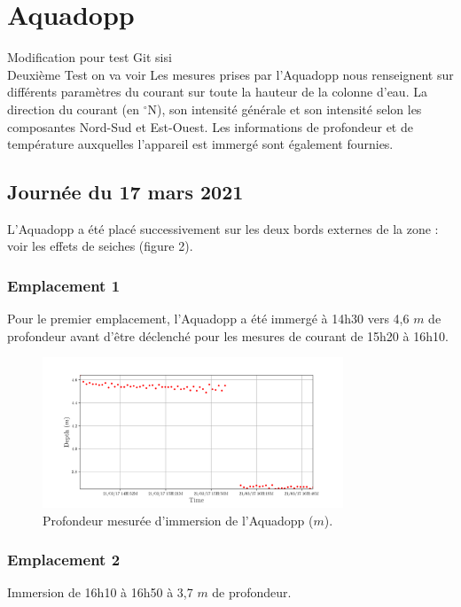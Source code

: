 \documentclass[12pt]{article}
\begin{document}
\section{Aquadopp}
Modification pour test Git sisi\\
Deuxième Test on va voir 
Les mesures prises par l'Aquadopp nous renseignent sur différents paramètres du courant sur toute la hauteur de la colonne d'eau. La direction du courant (en $^{\circ}$N), son intensité générale et son intensité selon les composantes Nord-Sud et Est-Ouest. Les informations de profondeur et de température auxquelles l'appareil est immergé sont également fournies.

\subsection{Journée du 17 mars 2021}
L'Aquadopp a été placé successivement sur les deux bords externes de la zone : voir les effets de seiches (figure 2).

\subsubsection{Emplacement 1}
Pour le premier emplacement, l'Aquadopp a été immergé à 14h30 vers 4,6 $m$ de profondeur avant d'être déclenché pour les mesures de courant de 15h20 à 16h10.
	
	\begin{figure}[!ht]
		\begin{center}
			\includegraphics[width=0.8\textwidth]{1703F03depth.png}
			\caption{Profondeur mesurée d'immersion de l'Aquadopp ($m$).}
		\end{center}
	\end{figure}

\subsubsection{Emplacement 2}
	Immersion de 16h10 à 16h50 à 3,7 $m$ de profondeur.
	
\end{document}
